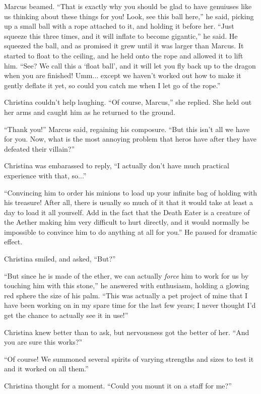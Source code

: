 \documentclass[showtrims,b6paper,draft,10pt]{memoir}
\begin{document}
Marcus beamed.  ``That is exactly why you should be glad to have genuiuses like us thinking about these things for you!  Look, see this ball here,'' he said, picking up a small ball with a rope attached to it, and holding it before her.  ``Just squeeze this three times, and it will inflate to become gigantic,'' he said.  He squeezed the ball, and as promised it grew until it was larger than Marcus.  It started to float to the ceiling, and he held onto the rope and allowed it to lift him.  ``See?  We call this a `float ball', and it will let you fly back up to the dragon when you are finished!  Umm... except we haven't worked out how to make it gently deflate it yet, so could you catch me when I let go of the rope.''

Christina couldn't help laughing.  ``Of course, Marcus,'' she replied.  She held out her arms and caught him as he returned to the ground.

``Thank you!'' Marcus said, regaining his composure.  ``But this isn't all we have for you.  Now, what is the most annoying problem that heros have after they have defeated their villain?''

Christina was embarassed to reply, ``I actually don't have much practical experience with that, so...''

``Convincing him to order his minions to load up your infinite bag of holding with his treasure!  After all, there is usually so much of it that it would take at least a day to load it all yourself.  Add in the fact that the Death Eater is a creature of the Aether making him very difficult to hurt directly, and it would normally be impossible to convince him to do anything at all for you.''  He paused for dramatic effect.

Christina smiled, and asked, ``But?''

``But since he is made of the ether, we can actually \emph{force} him to work for us by touching him with this stone,'' he answered with enthusiasm, holding a glowing red sphere the size of his palm.  ``This was actually a pet project of mine that I have been working on in my spare time for the last few years;  I never thought I'd get the chance to actually see it in use!''

Christina knew better than to ask, but nervousness got the better of her.  ``And you are sure this works?''

``Of course!  We summoned several spirits of varying strengths and sizes to test it and it worked on all them.''

Christina thought for a moment.  ``Could you mount it on a staff for me?''
\end{document}
